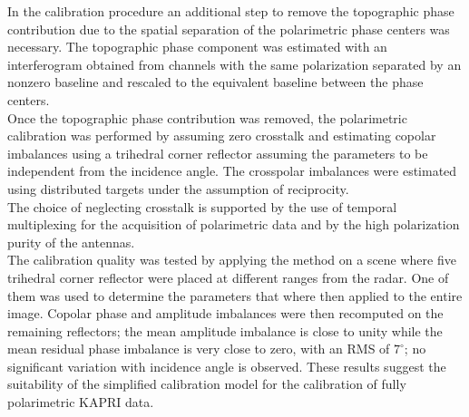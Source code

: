 In the calibration procedure an additional step to remove the topographic phase contribution due to the spatial separation of the polarimetric phase centers was necessary. The topographic phase component was estimated with an interferogram obtained from channels with the same polarization separated by an nonzero baseline and rescaled to the equivalent baseline between the phase centers.\\ Once the topographic phase contribution was removed, the polarimetric calibration was performed by assuming zero crosstalk and estimating copolar imbalances using a trihedral corner reflector assuming the parameters to be independent from the  incidence angle. The crosspolar imbalances were estimated using distributed targets under the assumption of reciprocity.\\ The choice of neglecting crosstalk is supported by the use of temporal multiplexing for the acquisition of polarimetric data and by the high polarization purity of the antennas.\\ The calibration quality was tested by applying the method on a scene where five trihedral corner reflector were placed at different ranges from the radar. One of them was used to determine the parameters that where then applied to the entire image. Copolar phase and amplitude imbalances were then recomputed on the remaining reflectors; the mean amplitude imbalance is close to unity while the mean residual phase imbalance is very close to zero, with an RMS of $7^\circ$; no significant variation with incidence angle is observed. These results suggest the suitability of the simplified calibration model for the calibration of fully polarimetric KAPRI data.